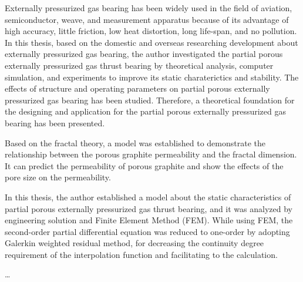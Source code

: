 \begin{eabstract}
  Externally pressurized gas bearing has been widely used in the field of aviation, semiconductor, weave, and measurement apparatus because of its advantage of high accuracy, little friction, low heat distortion, long life-span, and no pollution. In this thesis, based on the domestic and overseas researching development about externally pressurized gas bearing, the author investigated the partial porous externally pressurized gas thrust bearing by theoretical analysis, computer simulation, and experiments to improve its static charaterictics and stability. The effects of structure and operating parameters on partial porous externally pressurized gas bearing has been studied. Therefore, a theoretical foundation for the designing and application for the partial porous externally pressurized gas bearing has been presented. 
  
Based on the fractal theory, a model was established to demonstrate the relationship between the porous graphite permeability and the fractal dimension. It can predict the permeability of porous graphite and show the effects of the pore size on the permeability. 

In this thesis, the author established a model about the static characteristics of partial porous externally pressurized gas thrust bearing, and it was analyzed by engineering solution and Finite Element Method (FEM). While using FEM, the second-order partial differential equation was reduced to one-order by adopting Galerkin weighted residual method, for decreasing the continuity degree requirement of the interpolation function and facilitating to the calculation.

…

\end{eabstract}
